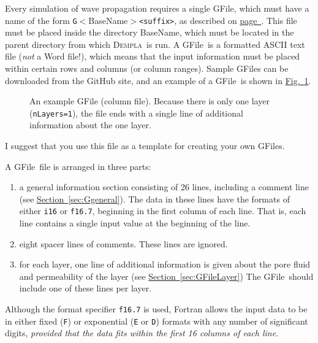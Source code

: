 \documentclass[letterpaper,11pt]{article}
\newcommand{\Dempla}{\textsc{Dempla}}
\newcommand{\BaseName}{\textsf{BaseName}}
\newcommand{\GFile}{\textsf{GFile}}
\begin{document}
%
Every simulation of wave propagation requires a single
\GFile, which must have a name of the form
\texttt{G}$<$\BaseName$>$\texttt{<suffix>},
as described on
\hyperref[item:BaseName2]{page~\pageref*{item:BaseName2}}.
This file must be placed inside the directory
\BaseName, which must be located in the parent directory
from which \Dempla\ is run.
%
A \GFile\ is a formatted ASCII text file
(\emph{not} a Word file!),
which means that
the input information must be placed within certain rows
and columns (or column ranges).
Sample \GFile s can be 
downloaded from the GitHub site,
and an example of a \GFile\ is shown in
\hyperref[fig:GFile]{Fig.~\ref*{fig:GFile}}.
%
\begin{figure}
	\centering\footnotesize
	
	\caption{An example \textsf{GFile} (column file).
	Because there is only one layer (\texttt{nLayers=1}),
	the file ends with a single line of additional information
	about the one layer.}
	\label{fig:GFile}
\end{figure}
%
%	
%
I suggest that you use this file as a template for creating your
own \GFile s.
%
\par
A \GFile\ file is arranged in three parts:
\begin{enumerate}
	\item
	a general information section consisting of 26 lines,
	including a comment line
	(see
	\hyperref[sec:Ggeneral]{Section~\ref*{sec:Ggeneral}}).
	The data in these lines have the formats of either
	\texttt{i16} or \texttt{f16.7}, beginning in the
	first column of each line.
	That is, each line contains a single input value 
	at the beginning of the line.
	\item
	eight spacer lines of comments.  These lines are ignored.
	\item
	for each layer, one line of additional information
	is given about the pore fluid and permeability of the layer
	(see
	\hyperref[sec:GFileLayer]{Section~\ref*{sec:GFileLayer}})
	The \GFile\ should include one of these lines per layer.
\end{enumerate}
%
Although the format specifier \texttt{f16.7} is used, Fortran allows
the input data to be in either fixed (\texttt{F}) or
exponential (\texttt{E} or \texttt{D}) formats with any number
of significant digits, \emph{provided that the data fits within the 
first 16 columns of each line}.
%
\end{document}
